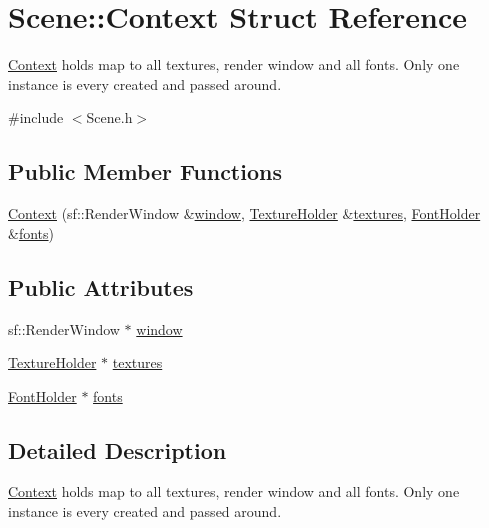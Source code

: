 \hypertarget{struct_scene_1_1_context}{}\section{Scene\+:\+:Context Struct Reference}
\label{struct_scene_1_1_context}


\hyperlink{struct_scene_1_1_context}{Context} holds map to all textures, render window and all fonts. Only one instance is every created and passed around.  




{\ttfamily \#include $<$Scene.\+h$>$}

\subsection*{Public Member Functions}
\begin{DoxyCompactItemize}
\item 
\hyperlink{struct_scene_1_1_context_ac08956521e8de60178029d2fe236819b}{Context} (sf\+::\+Render\+Window \&\hyperlink{struct_scene_1_1_context_a4ea0d87e64ed3888a01bfb67e7ac1b84}{window}, \hyperlink{_resource_identifiers_8h_a96220f9135333a0209f9367a28b7da13}{Texture\+Holder} \&\hyperlink{struct_scene_1_1_context_a6ec97ee92bfa4d09abc6edc9508d0050}{textures}, \hyperlink{_resource_identifiers_8h_ac2733d29d4a4d26a739742097fc51ede}{Font\+Holder} \&\hyperlink{struct_scene_1_1_context_ae8a09bf6b99a1081940f2f2d73db0272}{fonts})
\end{DoxyCompactItemize}
\subsection*{Public Attributes}
\begin{DoxyCompactItemize}
\item 
sf\+::\+Render\+Window $\ast$ \hyperlink{struct_scene_1_1_context_a4ea0d87e64ed3888a01bfb67e7ac1b84}{window}
\item 
\hyperlink{_resource_identifiers_8h_a96220f9135333a0209f9367a28b7da13}{Texture\+Holder} $\ast$ \hyperlink{struct_scene_1_1_context_a6ec97ee92bfa4d09abc6edc9508d0050}{textures}
\item 
\hyperlink{_resource_identifiers_8h_ac2733d29d4a4d26a739742097fc51ede}{Font\+Holder} $\ast$ \hyperlink{struct_scene_1_1_context_ae8a09bf6b99a1081940f2f2d73db0272}{fonts}
\end{DoxyCompactItemize}


\subsection{Detailed Description}
\hyperlink{struct_scene_1_1_context}{Context} holds map to all textures, render window and all fonts. Only one instance is every created and passed around. 



